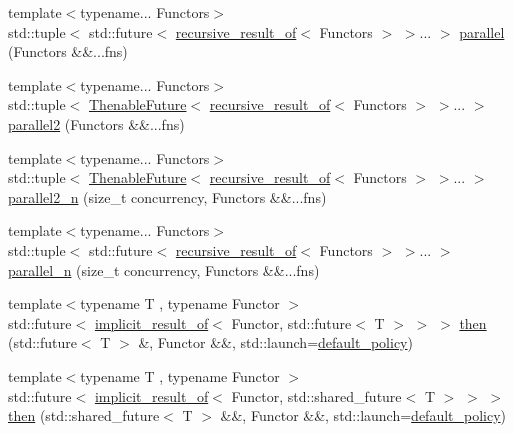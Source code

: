 \begin{DoxyCompactItemize}
{\footnotesize template$<$typename... Functors$>$ }\\std\+::tuple$<$ std\+::future$<$ \hyperlink{namespacethenable_ae5c96f83512d34d52e355cacdec0eb02}{recursive\+\_\+result\+\_\+of}$<$ Functors $>$ $>$... $>$ \hyperlink{namespacethenable_a95e108dc8790ef2db88424ea3ae46c79}{parallel} (Functors \&\&...fns)
\item 
{\footnotesize template$<$typename... Functors$>$ }\\std\+::tuple$<$ \hyperlink{classthenable_1_1_thenable_future}{Thenable\+Future}$<$ \hyperlink{namespacethenable_ae5c96f83512d34d52e355cacdec0eb02}{recursive\+\_\+result\+\_\+of}$<$ Functors $>$ $>$... $>$ \hyperlink{namespacethenable_a4619a50a59383db8a890cc02d8e44262}{parallel2} (Functors \&\&...fns)
\item 
{\footnotesize template$<$typename... Functors$>$ }\\std\+::tuple$<$ \hyperlink{classthenable_1_1_thenable_future}{Thenable\+Future}$<$ \hyperlink{namespacethenable_ae5c96f83512d34d52e355cacdec0eb02}{recursive\+\_\+result\+\_\+of}$<$ Functors $>$ $>$... $>$ \hyperlink{namespacethenable_ae386feb6dd2b3b1171a9f40f25b57f22}{parallel2\+\_\+n} (size\+\_\+t concurrency, Functors \&\&...fns)
\item 
{\footnotesize template$<$typename... Functors$>$ }\\std\+::tuple$<$ std\+::future$<$ \hyperlink{namespacethenable_ae5c96f83512d34d52e355cacdec0eb02}{recursive\+\_\+result\+\_\+of}$<$ Functors $>$ $>$... $>$ \hyperlink{namespacethenable_ae08454ef27fbe2ce5a3f6b2b008a0bc2}{parallel\+\_\+n} (size\+\_\+t concurrency, Functors \&\&...fns)
\item 
{\footnotesize template$<$typename T , typename Functor $>$ }\\std\+::future$<$ \hyperlink{namespacethenable_a1ecf08d6ad8b8688d7b4df047b5feaae}{implicit\+\_\+result\+\_\+of}$<$ Functor, std\+::future$<$ T $>$ $>$ $>$ \hyperlink{namespacethenable_aa7417767a6d39589457c2569f900e9e8}{then} (std\+::future$<$ T $>$ \&, Functor \&\&, std\+::launch=\hyperlink{namespacethenable_a55a20a452e9ba9c0eff946d9b8636f06}{default\+\_\+policy})
\item 
{\footnotesize template$<$typename T , typename Functor $>$ }\\std\+::future$<$ \hyperlink{namespacethenable_a1ecf08d6ad8b8688d7b4df047b5feaae}{implicit\+\_\+result\+\_\+of}$<$ Functor, std\+::shared\+\_\+future$<$ T $>$ $>$ $>$ \hyperlink{namespacethenable_a591eb14beddb29e6d25591b5f85af87a}{then} (std\+::shared\+\_\+future$<$ T $>$ \&\&, Functor \&\&, std\+::launch=\hyperlink{namespacethenable_a55a20a452e9ba9c0eff946d9b8636f06}{default\+\_\+policy})

\end{DoxyCompactItemize}
